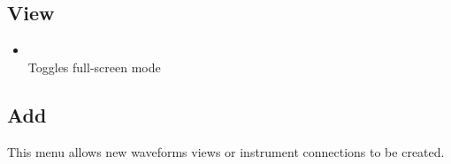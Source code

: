 \subsection{View}

\begin{itemize}

\item {}\\
Toggles full-screen mode

\end{itemize}

\subsection{Add}

This menu allows new waveforms views or instrument connections to be created.

